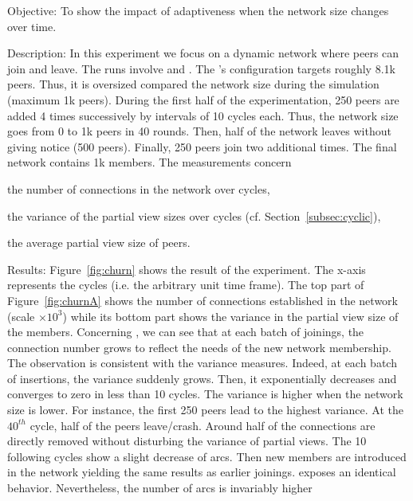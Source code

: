 \begin{asparadesc}
\item[Objective:] To show the impact of adaptiveness when the network size
  changes over time.
\item[Description:] In this experiment we focus on a dynamic network where
  peers can join and leave. The runs involve \CYCLON and \SPRAY. The \CYCLON's
  configuration targets roughly 8.1k peers. Thus, it is oversized compared the
  network size during the simulation (maximum 1k peers). During the first half
  of the experimentation, 250 peers are added 4 times successively by intervals
  of 10 cycles each. Thus, the network size goes from 0 to 1k peers in 40
  rounds. Then, half of the network leaves without giving notice (500
  peers). Finally, 250 peers join two additional times. The final network
  contains 1k members. The measurements concern
  \begin{inparaenum}
  \item the number of connections in the network over cycles,
  \item the variance of the partial view sizes over cycles
    (cf. Section~\ref{subsec:cyclic}),
  \item the average partial view size of peers.
  \end{inparaenum}
\item[Results:] Figure~\ref{fig:churn} shows the result of the experiment. The
  x-axis represents the cycles (i.e. the arbitrary unit time frame). The top
  part of Figure~\ref{fig:churnA} shows the number of connections established
  in the network (scale $\times 10^3$) while its bottom part shows the variance
  in the partial view size of the members. Concerning \SPRAY, we can see that
  at each batch of joinings, the connection number grows to reflect the needs
  of the new network membership. The observation is consistent with the
  variance measures. Indeed, at each batch of insertions, the variance suddenly
  grows. Then, it exponentially decreases and converges to zero in less than 10
  cycles. The variance is higher when the network size is lower. For instance,
  the first 250 peers lead to the highest variance. At the $40^{th}$ cycle,
  half of the peers leave/crash. Around half of the connections are directly
  removed without disturbing the variance of partial views. The 10 following
  cycles show a slight decrease of arcs. Then new members are introduced in the
  network yielding the same results as earlier joinings. \CYCLON exposes an
  identical behavior. Nevertheless, the number of arcs is invariably higher

\end{asparadesc}
